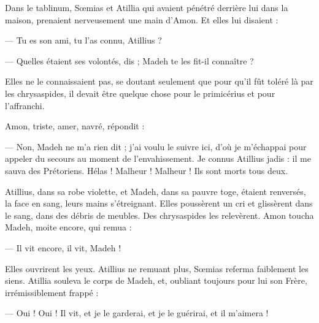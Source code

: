 \documentclass[a4paper, 11pt, oneside, polutonikogreek, french]{article}
\begin{document}
Dans le tablinum, Sœmias et Atillia qui avaient pénétré derrière lui dans la maison, prenaient nerveusement une main d'Amon. Et elles lui disaient :

--- Tu es son ami, tu l'as connu, Atillius ?

--- Quelles étaient ses volontés, dis ; Madeh te les fit-il connaître ?

Elles ne le connaissaient pas, se doutant seulement que pour qu'il fût toléré là par les chrysaspides, il devait être quelque chose pour le primicérius et pour l'affranchi.

Amon, triste, amer, navré, répondit :

--- Non, Madeh ne m'a rien dit ; j'ai voulu le suivre ici, d'où je m'échappai pour appeler du secours au moment de l'envahissement. Je connus Atillius jadis : il me sauva des Prétoriens. Hélas ! Malheur ! Malheur ! Ils sont morts tous deux.

Atillius, dans sa robe violette, et Madeh, dans sa pauvre toge, étaient renversés, la face en sang, leurs mains s'étreignant. Elles poussèrent un cri et glissèrent dans le sang, dans des débris de meubles. Des chrysaspides les relevèrent. Amon toucha Madeh, moite encore, qui remua :

--- Il vit encore, il vit, Madeh !

Elles ouvrirent les yeux. Atillius ne remuant plus, Sœmias referma faiblement les siens. Atillia souleva le corps de Madeh, et, oubliant toujours pour lui son Frère, irrémissiblement frappé :

--- Oui ! Oui ! Il vit, et je le garderai, et je le guérirai, et il m'aimera !
\clearpage
\subsection{}
\end{document}
